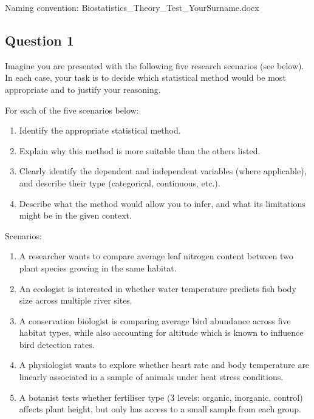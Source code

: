 \documentclass[
  10t,
]{article}
\providecommand{\tightlist}{%
  \setlength{\itemsep}{0pt}\setlength{\parskip}{0pt}}
\renewcommand{\ttfamily}{\small\fontspec{FiraCode Nerd Font}\color{DeepSkyBlue4}}
\renewcommand{\texttt}[1]{{\ttfamily #1}}
\begin{document}
Naming convention:
\texttt{Biostatistics\_Theory\_Test\_YourSurname.docx}

\subsection{Question 1}\label{question-1}

Imagine you are presented with the following five research scenarios
(see below). In each case, your task is to decide which statistical
method would be most appropriate and to justify your reasoning.

For each of the five scenarios below:

\begin{enumerate}
\def\labelenumi{\alph{enumi}.}
\tightlist
\item
  Identify the appropriate statistical method.
\item
  Explain why this method is more suitable than the others listed.
\item
  Clearly identify the dependent and independent variables (where
  applicable), and describe their type (categorical, continuous, etc.).
\item
  Describe what the method would allow you to infer, and what its
  limitations might be in the given context.
\end{enumerate}

Scenarios:

\begin{enumerate}
\def\labelenumi{\arabic{enumi}.}
\tightlist
\item
  A researcher wants to compare average leaf nitrogen content between
  two plant species growing in the same habitat.
\item
  An ecologist is interested in whether water temperature predicts fish
  body size across multiple river sites.
\item
  A conservation biologist is comparing average bird abundance across
  five habitat types, while also accounting for altitude which is known
  to influence bird detection rates.
\item
  A physiologist wants to explore whether heart rate and body
  temperature are linearly associated in a sample of animals under heat
  stress conditions.
\item
  A botanist tests whether fertiliser type (3 levels: organic,
  inorganic, control) affects plant height, but only has access to a
  small sample from each group.
\end{enumerate}
\end{document}
